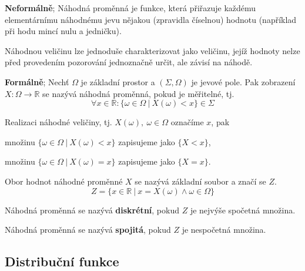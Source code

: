 \begin{compactitem}
    \item \textbf{Neformálně}; Náhodná proměnná je funkce, která přiřazuje každému elementárnímu náhodnému jevu nějakou (zpravidla číselnou) hodnotu (například při hodu mincí  nulu a  jedničku). \begin{compactitem}
        \item Náhodnou veličinu lze jednoduše charakterizovat jako veličinu, jejíž hodnoty nelze před provedením pozorování jednoznačně určit, ale závisí na náhodě.
    \end{compactitem}

    \item \textbf{Formálně}; Nechť $\Omega$ je základní prostor a $(\Sigma, \Omega)$ je jevové pole. Pak zobrazení $X : \Omega \rightarrow \mathbb{R}$ se nazývá náhodná proměnná, pokud je měřitelné, tj.
    $$\forall x \in \mathbb{R} : \{ \omega \in \Omega ~|~ X(\omega) < x \} \in \Sigma$$

    \item Realizaci náhodné veličiny, tj. $X(\omega),~ \omega \in \Omega$ označíme $x$, pak \begin{compactitem}
        \item množinu $\{ \omega \in \Omega ~|~ X(\omega) < x \}$ zapisujeme jako $\{ X < x \}$,

        \item množinu $\{ \omega \in \Omega ~|~ X(\omega) = x \}$ zapisujeme jako $\{ X = x \}$.
    \end{compactitem}

    \item Obor hodnot náhodné proměnné $X$ se nazývá základní soubor a značí se $Z$.
    $$ Z = \{ x \in \mathbb{R} ~|~ x = X(\omega) \land \omega \in \Omega \} $$ \begin{compactitem}

        \item Náhodná proměnná se nazývá \textbf{diskrétní}, pokud $Z$ je nejvýše spočetná množina.

        \item Náhodná proměnná se nazývá \textbf{spojitá}, pokud $Z$ je nespočetná množina.
    \end{compactitem}
\end{compactitem}

\subsection{Distribuční funkce}

